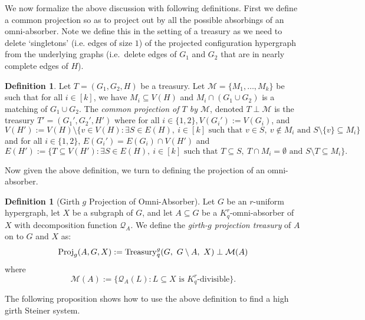 \documentclass[11pt]{article}
\newcommand{\mc}[1]{\mathcal{#1}}
\newcounter{i}
\theoremstyle{plain}
\theoremstyle{plain} %
\theoremstyle{definition}
\newtheorem{definition}[thm]{Definition}
\begin{document}
We now formalize the above discussion with following definitions. First we define a common projection so as to project out by all the possible absorbings of an omni-absorber. Note we define this in the setting of a treasury as we need to delete `singletons' (i.e. edges of size $1$) of the projected configuration hypergraph from the underlying graphs (i.e.~delete edges of $G_1$ and $G_2$ that are in nearly complete edges of $H$).


\begin{definition}
Let $T=(G_1,G_2,H)$ be a treasury. Let $\mathcal{M}=\{M_1,\ldots,M_k\}$ be such that for all $i\in [k]$, we have $M_i\subseteq V(H)$ and $M_i\cap (G_1\cup G_2)$ is a matching of $G_1\cup G_2$. The \emph{common projection of $T$ by $\mathcal{M}$}, denoted $T\perp \mathcal{M}$ is the treasury  $T'=(G_1',G_2',H')$ where for all $i\in \{1,2\}, $$V(G_i'):=V(G_i)$, and
$$V(H') := V(H)\setminus \{ v\in V(H): \exists S\in E(H),~i\in[k] \text{ such that } v\in S,~v\not\in M_i \text{ and } S\setminus \{v\} \subseteq M_i \}$$
and for all $i\in \{1,2\}$, $E(G_i') = E(G_i)\cap V(H')$ and
$$E(H'):= \{ T \subseteq V(H'): \exists S\in E(H),~i\in [k] \text{ such that } T\subseteq S,~T\cap M_i=\emptyset \text{ and } S\setminus T \subseteq M_i \}.$$
\end{definition}

Now given the above definition, we turn to defining the projection of an omni-absorber. 

\begin{definition}[Girth $g$ Projection of Omni-Absorber]\label{def:OmniAbsorberProj}
Let $G$ be an $r$-uniform hypergraph, let $X$ be a subgraph of $G$, and let $A\subseteq G$ be a $K_q^r$-omni-absorber of $X$ with decomposition function $\mathcal{Q}_A$. We define the \emph{girth-$g$ projection treasury} of $A$ on to $G$ and $X$ as:
$${\rm Proj}_g(A,G,X):= {\rm Treasury}_q^g(G,~G\setminus A,~X) \perp \mc{M}(A)$$
where $$\mathcal{M}(A) := \{ \mathcal{Q}_A(L) : L\subseteq X \text{ is $K_q^r$-divisible}\}.$$
\end{definition}

The following proposition shows how to use the above definition to find a high girth Steiner system.
\end{document}
